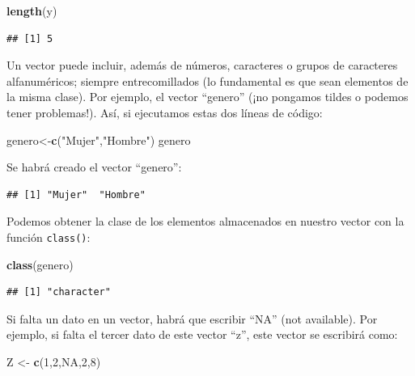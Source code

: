 \documentclass[
]{book}
\newenvironment{Shaded}{\begin{snugshade}}{\end{snugshade}}
\newcommand{\ConstantTok}[1]{\textcolor[rgb]{0.56,0.35,0.01}{#1}}
\newcommand{\DecValTok}[1]{\textcolor[rgb]{0.00,0.00,0.81}{#1}}
\newcommand{\FunctionTok}[1]{\textcolor[rgb]{0.13,0.29,0.53}{\textbf{#1}}}
\newcommand{\NormalTok}[1]{#1}
\newcommand{\OtherTok}[1]{\textcolor[rgb]{0.56,0.35,0.01}{#1}}
\newcommand{\StringTok}[1]{\textcolor[rgb]{0.31,0.60,0.02}{#1}}
\begin{document}
\begin{Shaded}
\begin{Highlighting}[]
\FunctionTok{length}\NormalTok{(y)}
\end{Highlighting}
\end{Shaded}

\begin{verbatim}
## [1] 5
\end{verbatim}

Un vector puede incluir, además de números, caracteres o grupos de caracteres alfanuméricos; siempre entrecomillados (lo fundamental es que sean elementos de la misma clase). Por ejemplo, el vector ``genero'' (¡no pongamos tildes o podemos tener problemas!). Así, si ejecutamos estas dos líneas de código:

\begin{Shaded}
\begin{Highlighting}[]
\NormalTok{genero}\OtherTok{\textless{}{-}}\FunctionTok{c}\NormalTok{(}\StringTok{"Mujer"}\NormalTok{,}\StringTok{"Hombre"}\NormalTok{)}
\NormalTok{genero}
\end{Highlighting}
\end{Shaded}

Se habrá creado el vector ``genero'':

\begin{verbatim}
## [1] "Mujer"  "Hombre"
\end{verbatim}

Podemos obtener la clase de los elementos almacenados en nuestro vector con la función \texttt{class()}:

\begin{Shaded}
\begin{Highlighting}[]
\FunctionTok{class}\NormalTok{(genero)}
\end{Highlighting}
\end{Shaded}

\begin{verbatim}
## [1] "character"
\end{verbatim}

Si falta un dato en un vector, habrá que escribir ``NA'' (not available). Por ejemplo, si falta el tercer dato de este vector ``z'', este vector se escribirá como:

\begin{Shaded}
\begin{Highlighting}[]
\NormalTok{Z }\OtherTok{\textless{}{-}} \FunctionTok{c}\NormalTok{(}\DecValTok{1}\NormalTok{,}\DecValTok{2}\NormalTok{,}\ConstantTok{NA}\NormalTok{,}\DecValTok{2}\NormalTok{,}\DecValTok{8}\NormalTok{)}
\end{Highlighting}
\end{Shaded}
\end{document}
